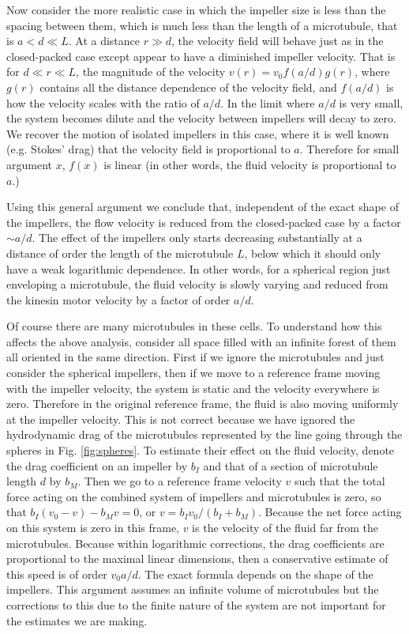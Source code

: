 \documentclass[pre,showpacs]{revtex4}
\begin{document}
Now consider the more realistic case in which the impeller size is less than
the spacing between them, which is much less than the length of a
microtubule, that is $a < d \ll L$.  At a distance $r \gg d$, the
velocity field will behave just as in the closed-packed case except appear
to have a diminished impeller velocity. That is for $d \ll r \ll L$,
the magnitude of the velocity $v(r)  = v_0 f(a/d) g(r)$, where $g(r)$
contains all the distance dependence of the velocity field, and $f(a/d)$
is how the velocity scales with the ratio of $a/d$. In the limit where
$a/d$ is very small, the system becomes dilute and the velocity between 
impellers will decay to zero. We recover the motion of isolated impellers
in this case, where it is well known (e.g. Stokes' drag) that the velocity
field is proportional to $a$. Therefore for small argument $x$, $f(x)$ is
linear (in other words, the fluid velocity is proportional to $a$.) 

Using this general argument we conclude that, independent of the exact shape of the impellers,
the flow velocity is reduced from the closed-packed case by a factor $\sim a/d$. The effect
of the impellers only starts decreasing substantially at a distance of order the
length of the microtubule $L$, below which it should only have a weak logarithmic
dependence. In other words, for a spherical region just enveloping a microtubule,
the fluid velocity is slowly varying and reduced from the kinesin motor velocity 
by a factor of order $a/d$.


Of course there are  many microtubules in these cells. To understand how this
affects the above analysis, consider all space filled with an infinite forest of them all oriented
in the same direction. 
First if we ignore the microtubules and just consider the spherical impellers, then
if we move to a reference frame moving with the impeller velocity, the system is static
and the velocity everywhere is zero. Therefore in the original reference frame, the
fluid is also moving uniformly at the impeller velocity. This is not correct because
we have ignored the hydrodynamic drag of the microtubules represented by the line going through
the spheres in Fig. \ref{fig:spheres}. To estimate their effect on the fluid velocity, 
denote the drag coefficient on an impeller by $b_I$ and that of a section of microtubule length $d$ by $b_M$. Then
we go to a reference frame velocity $v$ such that the total force acting on the combined system of
impellers and microtubules is zero, so that $b_I(v_0 - v) - b_M v = 0$, or $v = b_I v_0/(b_I + b_M)$.
Because the net force acting on this system is zero in this frame, $v$ is the velocity
of the fluid far from the microtubules.
Because within logarithmic corrections, the drag coefficients are proportional to the maximal
linear dimensions, then a conservative estimate of
this speed is of order $v_0 a/d$. The exact formula depends on the shape of
the impellers. This argument assumes an infinite volume of
microtubules but the corrections to this due to the finite nature of the system
are not important for the estimates we are making.
\end{document}
